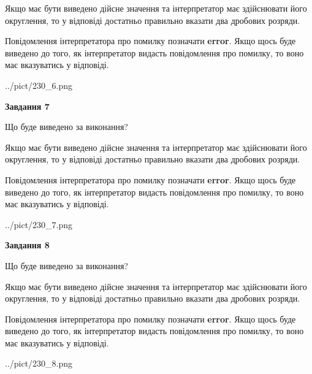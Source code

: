 \documentclass[12pt, ukrainian]{article}
\begin{document}
{\begin {Large}
Якщо має бути виведено дійсне значення та інтерпретатор має здійснювати його округлення, 
то у відповіді достатньо правильно вказати два дробових розряди.

Повідомлення інтерпретатора про помилку позначати \textbf{error}.
Якщо щось буде виведено до того, як інтерпретатор видасть повідомлення про помилку, 
то воно має вказуватись у відповіді. \par

\begin{center}
	{../pict/230_6.png}
\end{center}
\newpage

{\begin {center}\textbf{Завдання 7}\end {center}}\par
Що буде виведено за виконання? \par

Якщо має бути виведено дійсне значення та інтерпретатор має здійснювати його округлення, 
то у відповіді достатньо правильно вказати два дробових розряди.

Повідомлення інтерпретатора про помилку позначати \textbf{error}.
Якщо щось буде виведено до того, як інтерпретатор видасть повідомлення про помилку, 
то воно має вказуватись у відповіді. \par

\begin{center}
	{../pict/230_7.png}
\end{center}
\newpage

{\begin {center}\textbf{Завдання 8}\end {center}}\par
Що буде виведено за виконання? \par

Якщо має бути виведено дійсне значення та інтерпретатор має здійснювати його округлення, 
то у відповіді достатньо правильно вказати два дробових розряди.

Повідомлення інтерпретатора про помилку позначати \textbf{error}.
Якщо щось буде виведено до того, як інтерпретатор видасть повідомлення про помилку, 
то воно має вказуватись у відповіді. \par

\begin{center}
	{../pict/230_8.png}
\end{center}
\newpage


\end{Large}}
\end{document}
